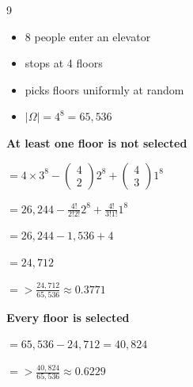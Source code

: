 \documentclass[12 pt]{article}
\begin{document}
    \begin{exercise}{9}
    \hfill

    \begin{itemize}
        \item 8 people enter an elevator
        \item stops at 4 floors
        \item picks floors uniformly at random
        \item $| \Omega | = 4^8 = 65,536$ 
    \end{itemize}

    \textbf{At least one floor is not selected}

    $ = 4 \times 3^8 - \begin{pmatrix}
        4 \\
        2
    \end{pmatrix} 2^8 + \begin{pmatrix}
        4 \\
        3
    \end{pmatrix} 1^8$

    $= 26,244 - \frac{4!}{2!2!} 2^8 + \frac{4!}{3!1!} 1^8$

    $= 26,244 - 1,536 + 4$

    $= 24,712$

    $=> \frac{24,712}{65,536} \approx 0.3771$

    \textbf{Every floor is selected}

    $= 65,536 - 24,712 = 40,824$

    $=> \frac{40,824}{65,536} \approx 0.6229$
        
    \end{exercise}
\end{document}
